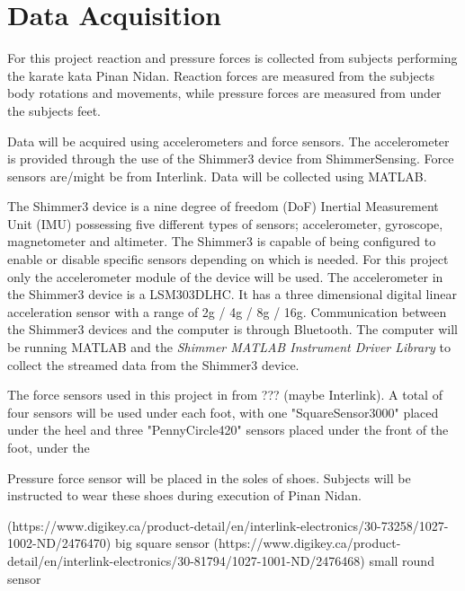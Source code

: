 \section{Data Acquisition}

For this project reaction and pressure forces is collected from subjects performing the karate kata Pinan Nidan. Reaction forces are measured from the subjects body rotations and movements, while pressure forces are measured from under the subjects feet. 

Data will be acquired using accelerometers and force sensors. The accelerometer is provided through the use of the Shimmer3 device from ShimmerSensing. Force sensors are/might be from Interlink. Data will be collected using MATLAB. 

The Shimmer3 device is a nine degree of freedom (DoF) Inertial Measurement Unit (IMU) possessing five different types of sensors; accelerometer, gyroscope, magnetometer and altimeter. The Shimmer3 is capable of being configured to enable or disable specific sensors depending on which is needed. For this project only the accelerometer module of the device will be used. The accelerometer in the Shimmer3 device is a LSM303DLHC. It has a three dimensional digital linear acceleration sensor with a range of \pm2g / \pm4g / \pm8g / \pm16g. \cite{LSM303DLHC} %
Communication between the Shimmer3 devices and the computer is through Bluetooth. The computer will be running MATLAB and the \textit{Shimmer MATLAB Instrument Driver Library} to collect the streamed data from the Shimmer3 device. 

The force sensors used in this project in from ??? (maybe Interlink). A total of four sensors will be used under each foot, with one "SquareSensor3000" placed under the heel and three "PennyCircle420" sensors placed under the front of the foot, under the 

Pressure force sensor will be placed in the soles of shoes. Subjects will be instructed to wear these shoes during execution of Pinan Nidan. 




(https://www.digikey.ca/product-detail/en/interlink-electronics/30-73258/1027-1002-ND/2476470) big square sensor
(https://www.digikey.ca/product-detail/en/interlink-electronics/30-81794/1027-1001-ND/2476468) small round sensor